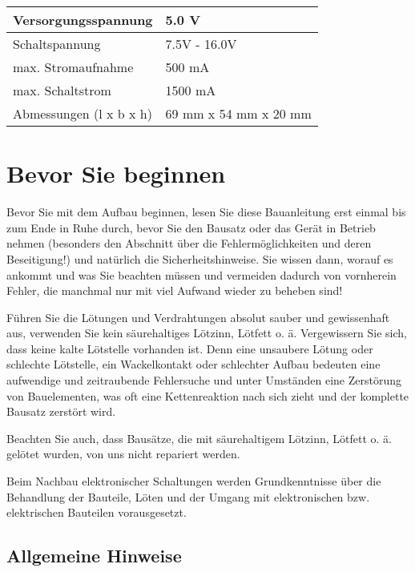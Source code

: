 \documentclass[fleqn,10pt]{SelfArx} %
\begin{document}
\begin{tabular}{ll}
Versorgungsspannung       & 5.0 V              \\ \hline
Schaltspannung            & 7.5V - 16.0V       \\ \hline
max. Stromaufnahme        & 500 mA             \\ \hline
max. Schaltstrom          & 1500 mA            \\ \hline
Abmessungen (l x b x h)   & 69 mm x 54 mm x 20 mm
\end{tabular}



\section{Bevor Sie beginnen}

Bevor Sie mit dem Aufbau beginnen, lesen Sie diese Bauanleitung erst einmal bis zum Ende in Ruhe durch, bevor Sie den Bausatz oder das Gerät in Betrieb nehmen (besonders den Abschnitt über die Fehlermöglichkeiten und deren Beseitigung!) und natürlich die Sicherheitshinweise. Sie wissen dann, worauf es ankommt und was Sie beachten müssen und vermeiden dadurch von vornherein Fehler, die manchmal nur mit viel Aufwand wieder zu beheben sind!

Führen Sie die Lötungen und Verdrahtungen absolut sauber und gewissenhaft aus, verwenden Sie kein säurehaltiges Lötzinn, Lötfett o. ä. Vergewissern Sie sich, dass keine kalte Lötstelle vorhanden ist. Denn eine unsaubere Lötung oder schlechte Lötstelle, ein Wackelkontakt oder schlechter Aufbau bedeuten eine aufwendige und zeitraubende Fehlersuche und unter Umständen eine Zerstörung von Bauelementen, was oft eine Kettenreaktion nach sich zieht und der komplette Bausatz zerstört wird.

Beachten Sie auch, dass Bausätze, die mit säurehaltigem Lötzinn, Lötfett o. ä. gelötet wurden, von uns nicht repariert werden.

Beim Nachbau elektronischer Schaltungen werden Grundkenntnisse über die Behandlung der Bauteile, Löten und der Umgang mit elektronischen bzw. elektrischen Bauteilen vorausgesetzt.

 \subsection*{Allgemeine Hinweise}
\end{document}
